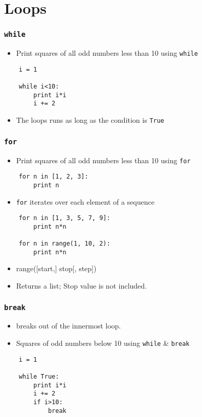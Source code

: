 \section{Loops}

\begin{frame}[fragile]
  \frametitle{\texttt{while}}
  \begin{itemize}
  \item Print squares of all odd numbers less than 10 using
    \texttt{while} 
  \end{itemize}
  \begin{lstlisting}
    i = 1

    while i<10:
        print i*i
        i += 2
  \end{lstlisting}
  \begin{itemize}
  \item The loops runs as long as the condition is \texttt{True}
  \end{itemize}
\end{frame}

\begin{frame}[fragile]
  \frametitle{\texttt{for}}
  \begin{itemize}
  \item Print squares of all odd numbers less than 10 using
    \texttt{for}
  \end{itemize}
  \begin{lstlisting}
    for n in [1, 2, 3]:
        print n
  \end{lstlisting}
  \begin{itemize}
  \item \texttt{for} iterates over each element of a sequence
  \end{itemize}
  \begin{lstlisting}
    for n in [1, 3, 5, 7, 9]: 
        print n*n

    for n in range(1, 10, 2):
        print n*n
  \end{lstlisting}
  \begin{itemize}
  \item \alert{range([start,] stop[, step])}
  \item Returns a list; Stop value is not included. 
  \end{itemize}
\end{frame}


\begin{frame}[fragile]
  \frametitle{\texttt{break}}
  \begin{itemize}
  \item breaks out of the innermost loop.
  \item Squares of odd numbers below 10 using \texttt{while} \&
    \texttt{break}
  \end{itemize}
  \begin{lstlisting}
    i = 1

    while True:
        print i*i
        i += 2
        if i>10:
            break
  \end{lstlisting}
\end{frame}

